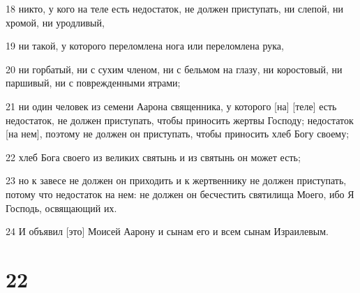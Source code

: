 \par 18 никто, у кого на теле есть недостаток, не должен приступать, ни слепой, ни хромой, ни уродливый,
\par 19 ни такой, у которого переломлена нога или переломлена рука,
\par 20 ни горбатый, ни с сухим членом, ни с бельмом на глазу, ни коростовый, ни паршивый, ни с поврежденными ятрами;
\par 21 ни один человек из семени Аарона священника, у которого [на] [теле] есть недостаток, не должен приступать, чтобы приносить жертвы Господу; недостаток [на нем], поэтому не должен он приступать, чтобы приносить хлеб Богу своему;
\par 22 хлеб Бога своего из великих святынь и из святынь он может есть;
\par 23 но к завесе не должен он приходить и к жертвеннику не должен приступать, потому что недостаток на нем: не должен он бесчестить святилища Моего, ибо Я Господь, освящающий их.
\par 24 И объявил [это] Моисей Аарону и сынам его и всем сынам Израилевым.

\chapter{22}

